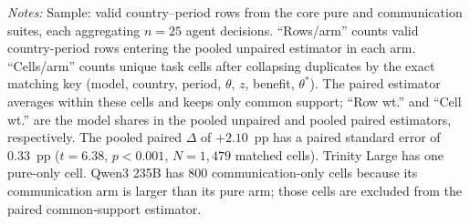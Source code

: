 \begin{table}[t]
\centering
\caption{Communication estimators: aggregation accounting.}
\label{tab:comm_estimators}
\footnotesize
\setlength{\tabcolsep}{2.5pt}
\begin{tablenotes}
\footnotesize\emph{Notes:} Sample: valid country--period rows from the core pure and communication suites, each aggregating $n = 25$ agent decisions. ``Rows/arm'' counts valid country-period rows entering the pooled unpaired estimator in each arm. ``Cells/arm'' counts unique task cells after collapsing duplicates by the exact matching key (model, country, period, $\theta$, $z$, benefit, $\theta^*$). The paired estimator averages within these cells and keeps only common support; ``Row wt.'' and ``Cell wt.'' are the model shares in the pooled unpaired and pooled paired estimators, respectively. The pooled paired $\Delta$ of $+2.10$~pp has a paired standard error of 0.33~pp ($t = 6.38$, $p <0.001$, $N = 1{,}479$ matched cells). Trinity Large has one pure-only cell. Qwen3 235B has 800 communication-only cells because its communication arm is larger than its pure arm; those cells are excluded from the paired common-support estimator.
\end{tablenotes}
\end{table}
